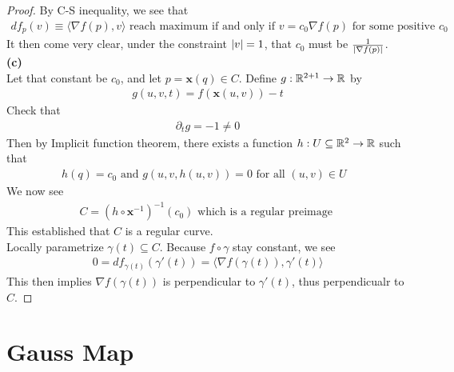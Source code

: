 \documentclass{report}
\begin{document}
\begin{proof}
By C-S inequality, we see that 
\begin{align*}
 df_p(v)\equiv \langle \nabla f(p),v\rangle \text{ reach maximum if and only if  $v=c_0\nabla f(p)$  for some positive $c_0$ }
\end{align*}
It then come very clear, under the constraint $\left|v\right|=1$, that $c_0$ must be  $\frac{1}{\left|\nabla f(p)\right|}$.\\

\textbf{(c)}\\

Let that constant be $c_0$, and let $p=\textbf{x}(q) \in C$. Define $g:\mathbb{R}^{2+1} \rightarrow \mathbb{R}$ by 
\begin{align*}
g(u,v,t)=f(\textbf{x}(u,v))-t
\end{align*}
Check that 
\begin{align*}
\partial_t g=-1 \neq 0
\end{align*}
Then by Implicit function theorem, there exists a function $h:U\subseteq \mathbb{R}^2 \rightarrow \mathbb{R}$ such that 
\begin{align*}
h(q)=c_0 \text{ and }g(u,v,h(u,v))=0\text{ for all $(u,v)\in U$ }
\end{align*}
We now see 
\begin{align*}
C=(h\circ \textbf{x}^{-1})^{-1}(c_0)\text{ which is a regular preimage }
\end{align*}
This established that $C$ is a regular curve.\\

Locally parametrize $\gamma (t)\subseteq C$. Because $f\circ \gamma $ stay constant, we see
\begin{align*}
0=df_{\gamma (t)}(\gamma '(t))=\langle \nabla f(\gamma (t)),\gamma '(t)\rangle 
\end{align*}
This then implies $\nabla f(\gamma (t))$ is perpendicular to $\gamma '(t)$, thus perpendicualr to $C$. 
\end{proof}
\chapter{Gauss Map}
\end{document}
